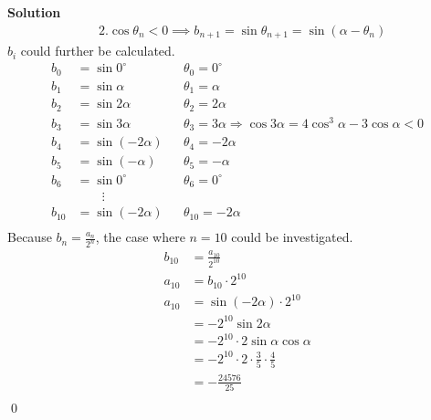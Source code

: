\documentclass{article}
\newenvironment{solution}{\begin{trivlist}\item[]{\bf Solution}}{\qed \end{trivlist}}
\begin{document}
\begin{solution}
\begin{align*}
    &2. \cos\theta_n < 0 \implies b_{n + 1}=\sin\theta_{n + 1} = \sin(\alpha - \theta_n)
\end{align*}
$b_i$ could further be calculated.
\begin{align*}
    b_0 &= \sin0^{\circ}  &&\theta_0 = 0^{\circ} \\
    b_1 &= \sin\alpha &&\theta_1 = \alpha \\
    b_2 &= \sin2\alpha &&\theta_2 = 2\alpha \\
    b_3 &= \sin3\alpha &&\theta_3 = 3\alpha \Rightarrow \cos3\alpha = 4\cos^3\alpha - 3\cos\alpha < 0 \\
    b_4 &= \sin(-2\alpha) &&\theta_4 = -2\alpha \\
    b_5 &= \sin(-\alpha) &&\theta_5 = -\alpha \\
    b_6 &= \sin0^{\circ} &&\theta_6 = 0^{\circ} \\
    &\qquad \vdots \\
    b_{10} &= \sin(-2\alpha) &&\theta_{10} = -2\alpha \\
\end{align*}
Because $b_n = \frac{a_n}{2^n}$, the case where $n = 10$ could be investigated.
\begin{align*}
    b_{10} &= \frac{a_{10}}{2^{10}} \\
    a_{10} &= b_{10} \cdot 2^{10} \\
    a_{10}
    &= \sin(-2\alpha) \cdot 2^{10} \\
    &= -2^{10}\sin2\alpha \\
    &= -2^{10} \cdot 2\sin\alpha\cos\alpha \\
    &= -2^{10} \cdot 2 \cdot \frac{3}{5} \cdot \frac{4}{5} \\
    &= \boxed{-\frac{24576}{25}} \\
\end{align*}
\end{solution}
\end{document}
